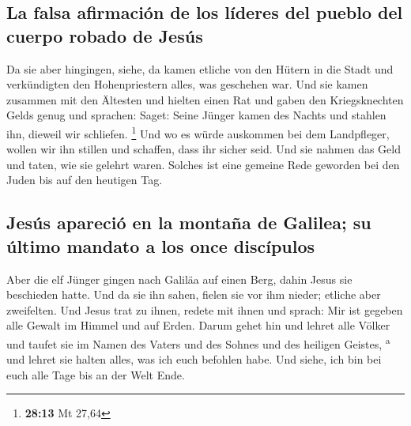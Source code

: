 \hypertarget{la-falsa-afirmaciuxf3n-de-los-luxedderes-del-pueblo-del-cuerpo-robado-de-jesuxfas}{%
\subsection{La falsa afirmación de los líderes del pueblo del cuerpo
robado de
Jesús}\label{la-falsa-afirmaciuxf3n-de-los-luxedderes-del-pueblo-del-cuerpo-robado-de-jesuxfas}}

 Da sie aber hingingen, siehe, da kamen etliche von den
Hütern in die Stadt und verkündigten den Hohenpriestern alles, was
geschehen war.  Und sie kamen zusammen mit den Ältesten
und hielten einen Rat und gaben den Kriegsknechten Gelds genug
 und sprachen: Saget: Seine Jünger kamen des Nachts und
stahlen ihn, dieweil wir schliefen. \footnote{\textbf{28:13} Mt 27,64}
 Und wo es würde auskommen bei dem Landpfleger, wollen
wir ihn stillen und schaffen, dass ihr sicher seid.  Und
sie nahmen das Geld und taten, wie sie gelehrt waren. Solches ist eine
gemeine Rede geworden bei den Juden bis auf den heutigen Tag.

\hypertarget{jesuxfas-apareciuxf3-en-la-montauxf1a-de-galilea-su-uxfaltimo-mandato-a-los-once-discuxedpulos}{%
\subsection{Jesús apareció en la montaña de Galilea; su último mandato a
los once
discípulos}\label{jesuxfas-apareciuxf3-en-la-montauxf1a-de-galilea-su-uxfaltimo-mandato-a-los-once-discuxedpulos}}

 Aber die elf Jünger gingen nach Galiläa auf einen Berg,
dahin Jesus sie beschieden hatte.  Und da sie ihn sahen,
fielen sie vor ihm nieder; etliche aber zweifelten.  Und
Jesus trat zu ihnen, redete mit ihnen und sprach: Mir ist gegeben alle
Gewalt im Himmel und auf Erden.  Darum gehet hin und
lehret alle Völker und taufet sie im Namen des Vaters und des Sohnes und
des heiligen Geistes, \textsuperscript{a}  und lehret sie
halten alles, was ich euch befohlen habe. Und siehe, ich bin bei euch
alle Tage bis an der Welt Ende.
